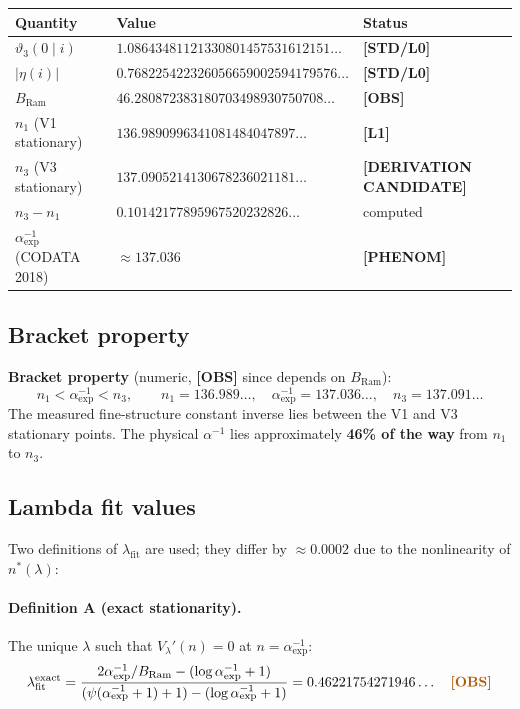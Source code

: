 \documentclass[12pt,a4paper]{article}
\theoremstyle{definition}
\theoremstyle{remark}
\newcommand{\STDLZ}{\textcolor{gray!70!black}{\textbf{[STD/L0]}}}
\newcommand{\OBS}{\textcolor{orange!70!black}{\textbf{[OBS]}}}
\newcommand{\DERIVCAND}{\textcolor{orange!80!black}{\textbf{[DERIVATION CANDIDATE]}}}
\newcommand{\PHENOM}{\textcolor{purple!70!black}{\textbf{[PHENOM]}}}
\newcommand{\Lone}{\textbf{[L1]}}
\newcommand{\BRam}{B_{\mathrm{Ram}}}
\begin{document}
\begin{center}
\begin{tabular}{@{}lll@{}}
\toprule
Quantity & Value & Status \\
\midrule
$\vartheta_3(0\mid i)$ & $1.08643481121330801457531612151\ldots$ & \STDLZ \\
$|\eta(i)|$ & $0.768225422326056659002594179576\ldots$ & \STDLZ \\
$\BRam$ & $46.280872383180703498930750708\ldots$ & \OBS \\
$n_1$ (V1 stationary) & $136.9890996341081484047897\ldots$ & \Lone \\
$n_3$ (V3 stationary) & $137.0905214130678236021181\ldots$ & \DERIVCAND \\
$n_3 - n_1$ & $0.10142177895967520232826\ldots$ & computed \\
$\alpha_{\mathrm{exp}}^{-1}$ (CODATA 2018) & $\approx 137.036$ & \PHENOM \\
\bottomrule
\end{tabular}
\end{center}

\subsection{Bracket property}

\begin{resultbox}
\textbf{Bracket property} (numeric, \OBS{} since depends on $\BRam$):
\begin{equation}
  n_1 < \alpha_{\mathrm{exp}}^{-1} < n_3,
  \qquad
  n_1 = 136.989\ldots,\quad
  \alpha_{\mathrm{exp}}^{-1} = 137.036\ldots,\quad
  n_3 = 137.091\ldots
  \label{eq:bracket}
\end{equation}
The measured fine-structure constant inverse lies between the V1 and V3
stationary points.  The physical $\alpha^{-1}$ lies approximately
\textbf{46\% of the way} from $n_1$ to $n_3$.
\end{resultbox}

\subsection{Lambda fit values}

Two definitions of $\lambda_{\mathrm{fit}}$ are used; they differ by $\approx 0.0002$
due to the nonlinearity of $n^*(\lambda)$:

\paragraph{Definition A (exact stationarity).}
The unique $\lambda$ such that $V_\lambda'(n) = 0$ at $n = \alpha_{\mathrm{exp}}^{-1}$:
\begin{equation}
  \lambda_{\mathrm{fit}}^{\mathrm{exact}} =
    \frac{2\alpha_{\mathrm{exp}}^{-1}/\BRam - (\log\alpha_{\mathrm{exp}}^{-1}+1)}
         {(\psi(\alpha_{\mathrm{exp}}^{-1}+1)+1) - (\log\alpha_{\mathrm{exp}}^{-1}+1)}
  = 0.46221754271946\ldots
  \quad \OBS
  \label{eq:lambda_exact}
\end{equation}
\end{document}

